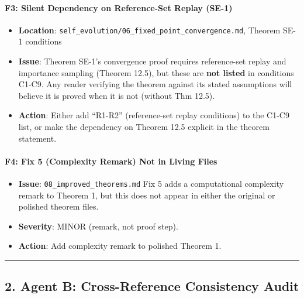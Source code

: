 \documentclass[
  12pt,
]{ctexart}
\providecommand{\tightlist}{%
  \setlength{\itemsep}{0pt}\setlength{\parskip}{0pt}}
\begin{document}
\paragraph{F3: Silent Dependency on Reference-Set Replay
(SE-1)}\label{f3-silent-dependency-on-reference-set-replay-se-1}

\begin{itemize}
\tightlist
\item
  \textbf{Location}:
  \texttt{self\_evolution/06\_fixed\_point\_convergence.md}, Theorem
  SE-1 conditions
\item
  \textbf{Issue}: Theorem SE-1's convergence proof requires
  reference-set replay and importance sampling (Theorem 12.5), but these
  are \textbf{not listed} in conditions C1-C9. Any reader verifying the
  theorem against its stated assumptions will believe it is proved when
  it is not (without Thm 12.5).
\item
  \textbf{Action}: Either add ``R1-R2'' (reference-set replay
  conditions) to the C1-C9 list, or make the dependency on Theorem 12.5
  explicit in the theorem statement.
\end{itemize}

\paragraph{F4: Fix 5 (Complexity Remark) Not in Living
Files}\label{f4-fix-5-complexity-remark-not-in-living-files}

\begin{itemize}
\tightlist
\item
  \textbf{Issue}: \texttt{08\_improved\_theorems.md} Fix 5 adds a
  computational complexity remark to Theorem 1, but this does not appear
  in either the original or polished theorem files.
\item
  \textbf{Severity}: MINOR (remark, not proof step).
\item
  \textbf{Action}: Add complexity remark to polished Theorem 1.
\end{itemize}

\begin{center}\rule{0.5\linewidth}{0.5pt}\end{center}

\subsection{2. Agent B: Cross-Reference Consistency
Audit}\label{agent-b-cross-reference-consistency-audit}
\end{document}
